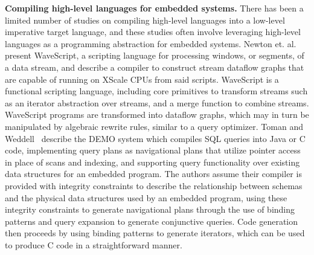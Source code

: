 \noindent \textbf{Compiling high-level languages for embedded systems.}
There has been a limited number of studies on compiling high-level languages
into a low-level imperative target language, and these studies often involve
leveraging high-level languages as a programming abstraction for embedded
systems.
Newton et. al.~\cite{newton-lctes:08} present WaveScript, a scripting language
for processing windows, or segments, of a data stream, and describe a compiler
to construct stream dataflow graphs that are capable of running on XScale
CPUs from said scripts. WaveScript is a functional scripting language,
including core primitives to transform streams such as an iterator abstraction
over streams, and a merge function to combine streams. WaveScript programs are
transformed into dataflow graphs, which may in turn be manipulated by algebraic
rewrite rules, similar to a query optimizer.
Toman and Weddell~\cite{toman-dbtel:01} describe the DEMO system which compiles
SQL queries into Java or C code, implementing query plans as navigational plans
that utilize pointer access in place of scans and indexing, and supporting query
functionality over existing data structures for an embedded program. The authors
assume their compiler is provided with integrity constraints to describe the
relationship between schemas and the physical data structures used by an embedded
program, using these integrity constraints to generate navigational plans through
the use of binding patterns and query expansion to generate conjunctive
queries. Code generation then proceeds by using binding patterns to generate
iterators, which can be used to produce C code in a straightforward manner.

